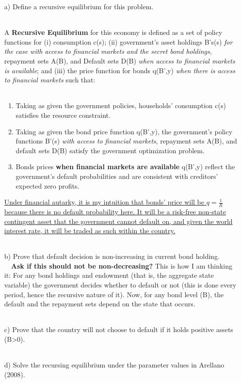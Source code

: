 \documentclass[a4paper]{article}
\begin{document}
\begin{itemize}
\item[a)] Define a recursive equilibrium for this problem.\\~\

A \textbf{Recursive Equilibrium} for this economy is defined as a set of policy functions for (i) consumption c(s); (ii) government's asset holdings B's(s) \textit{for the case with access to financial markets and the secret bond holdings}, repayment sets A(B), and Default sets D(B) \textit{when access to financial markets is available}; and (iii) the price function for bonds q(B',y) \textit{when there is access to financial markets} such that:\\~\

\begin{enumerate}
\item Taking as given the government policies, households' consumption c(s) satisfies the resource constraint.
\item Taking as given the bond price function q(B',y), the government's policy functions B'(s) \textit{with access to financial markets}, repayment sets A(B), and default sets D(B) satisfy the government optimization problem.
\item Bonds prices \textbf{when financial markets are available} q(B',y) reflect the government's default probabilities and are consistent with creditors' expected zero profits. 
\end{enumerate}

\underline{Under financial autarky, it is my intuition that bonds' price will be $q=\frac{1}{R}$ because there is no default probability here. It will be a risk-free non-state contingent asset that the government cannot default on, and given the world interest rate, it will be traded as such within the country.}\\~\

\item[b)] Prove that default decision is non-increasing in current bond holding.\\~\
\textbf{Ask if this should  not be non-decreasing?} This is how I am thinking it: For any bond holdings and endowment (that is, the aggregate state variable)  the government decides whether to default or not (this is done every period, hence the recursive nature of it). Now, for any bond level (B), the default and the repayment sets depend on the state that occurs.\\~\

\item[c)] Prove that the country will not choose to default if it holds positive assets (B>0).\\~\

\item[d)] Solve the recursing equilibrium under the parameter values in Arellano (2008). \\~\
\end{itemize}


%
%
\end{document}
